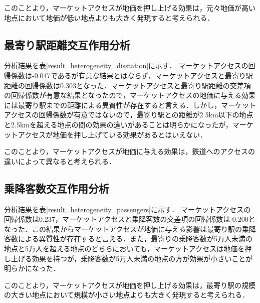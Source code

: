 このことより，マーケットアクセスが地価を押し上げる効果は，元々地価が高い地点において地価が低い地点よりも大きく発現すると考えられる．


\subsection{最寄り駅距離交互作用分析}
分析結果を表\ref{result_heterogeneity_disstation}に示す．
マーケットアクセスの回帰係数は-0.047であるが有意な結果とはならず，マーケットアクセスと最寄り駅距離の回帰係数は0.303となった．マーケットアクセスと最寄り駅距離の交差項の回帰係数が有意な結果となったので，マーケットアクセスの地価に与える効果には最寄り駅までの距離による異質性が存在すると言える．しかし，マーケットアクセスの回帰係数が有意ではないので，最寄り駅との距離が2.5km以下の地点と2.5kmを超える地点の間の効果の違いがあることは明らかになったが，マーケットアクセスが地価を押し上げている効果があるとはいえない．

このことより，マーケットアクセスが地価に与える効果は，鉄道へのアクセスの違いによって異なると考えられる．

\subsection{乗降客数交互作用分析}
分析結果を表\ref{result_heterogeneity_passengers}に示す．
マーケットアクセスの回帰係数は0.237，マーケットアクセスと乗降客数の交差項の回帰係数は-0.200となった．この結果からマーケットアクセスが地価に与える影響は最寄り駅の乗降客数による異質性が存在すると言える．また，最寄りの乗降客数が5万人未満の地点と5万人を超える地点のどちらにおいても，マーケットアクセスは地価を押し上げる効果を持つが，乗降客数が5万人未満の地点の方が効果が小さいことが明らかになった．

このことより，マーケットアクセスが地価を押し上げる効果は，最寄り駅の規模の大きい地点において規模が小さい地点よりも大きく発現すると考えられる．
